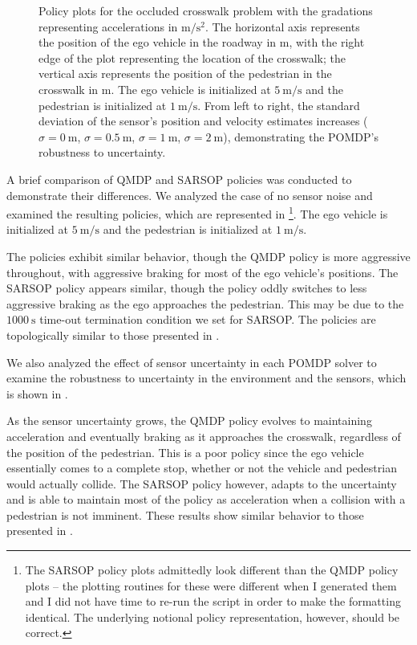 \documentclass[conference]{IEEEtran}
\begin{document}
\begin{figure}[htbp]
{    }
    \caption{Policy plots for the occluded crosswalk problem with the gradations representing accelerations in $\si{\meter\per\square\second}$. The horizontal axis represents the position of the ego vehicle in the roadway in $\si{\meter}$, with the right edge of the plot representing the location of the crosswalk; the vertical axis represents the position of the pedestrian in the crosswalk in $\si{\meter}$. The ego vehicle is initialized at $5 ~\si{\meter\per\second}$ and the pedestrian is initialized at $1 ~\si{\meter\per\second}$. From left to right, the standard deviation of the sensor's position and velocity estimates increases ($\sigma = 0~ \si{\meter}$, $\sigma = 0.5~ \si{\meter}$, $\sigma = 1~ \si{\meter}$, $\sigma = 2~ \si{\meter}$), demonstrating the POMDP's robustness to uncertainty.}
    \label{fig:qmdp_sarsop_2}
\end{figure}

A brief comparison of QMDP and SARSOP policies was conducted to demonstrate their differences. We analyzed the case of no sensor noise and examined the resulting policies, which are represented in \footnote{The SARSOP policy plots admittedly look different than the QMDP policy plots -- the plotting routines for these were different when I generated them and I did not have time to re-run the script in order to make the formatting identical. The underlying notional policy representation, however, should be correct.}. The ego vehicle is initialized at $5 ~\si{\meter\per\second}$ and the pedestrian is initialized at $1 ~\si{\meter\per\second}$.

The policies exhibit similar behavior, though the QMDP policy is more aggressive throughout, with aggressive braking for most of the ego vehicle's positions. The SARSOP policy appears similar, though the policy oddly switches to less aggressive braking as the ego approaches the pedestrian. This may be due to the $1000 ~\si{\second}$ time-out termination condition we set for SARSOP. The policies are topologically similar to those presented in \cite{Bouton2018ScalableDriving}.

We also analyzed the effect of sensor uncertainty in each POMDP solver to examine the robustness to uncertainty in the environment and the sensors, which is shown in .

As the sensor uncertainty grows, the QMDP policy evolves to maintaining acceleration and eventually braking as it approaches the crosswalk, regardless of the position of the pedestrian. This is a poor policy since the ego vehicle essentially comes to a complete stop, whether or not the vehicle and pedestrian would actually collide. The SARSOP policy however, adapts to the uncertainty and is able to maintain most of the policy as acceleration when a collision with a pedestrian is not imminent. 
These results show similar behavior to those presented in \cite{Bouton2018ScalableDriving}.
\end{document}
